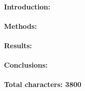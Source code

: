 \documentclass[11pt]{article}
\title{}
\author{}
\date{July 2018}
\begin{document}
\maketitle

\paragraph{Introduction:}
\paragraph{Methods:}
\paragraph{Results:}
\paragraph{Conclusions:}


\paragraph{}
\textbf{Total characters: 3800}
\end{document}
